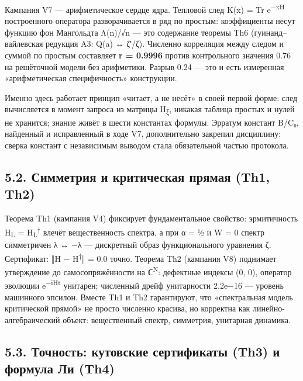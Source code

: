 \documentclass[11pt,a4paper]{article}
\begin{document}
Кампания V7 — арифметическое сердце ядра. Тепловой след K(x) = Tr e\textsuperscript{−xH} построенного оператора разворачивается в ряд по простым: коэффициенты несут функцию фон Мангольдта Λ(n)/√n — это содержание теоремы Th6 (гуинанд–вайлевская редукция A3: Q(a) ↔ ζ′/ζ). Численно корреляция между следом и суммой по простым составляет \textbf{r = 0.9996} против контрольного значения 0.76 на решёточной модели без арифметики. Разрыв 0.24 — это и есть измеренная «арифметическая специфичность» конструкции.

Именно здесь работает принцип «читает, а не несёт» в своей первой форме: след вычисляется в момент запроса из матрицы H\textsubscript{ξ}, никакая таблица простых и нулей не хранится; знание живёт в шести константах формулы. Эрратум констант B/C₀, найденный и исправленный в ходе V7, дополнительно закрепил дисциплину: сверка констант с независимым выводом стала обязательной частью протокола.

\begin{center}\end{center}

\subsection{5.2. Симметрия и критическая прямая (Th1, Th2)}

Теорема Th1 (кампания V4) фиксирует фундаментальное свойство: эрмитичность H\textsubscript{L} = H\textsubscript{L}\textsuperscript{†} влечёт вещественность спектра, а при α = ½ и W = 0 спектр симметричен λ ↔ −λ — дискретный образ функционального уравнения ζ. Сертификат: ‖H − H\textsuperscript{†}‖ = 0.0 точно. Теорема Th2 (кампания V8) поднимает утверждение до самосопряжённости на ℂ\textsuperscript{N}: дефектные индексы (0, 0), оператор эволюции e\textsuperscript{−iHt} унитарен; численный дрейф унитарности 2.2e−16 — уровень машинного эпсилон. Вместе Th1 и Th2 гарантируют, что «спектральная модель критической прямой» не просто численно красива, но корректна как линейно-алгебраический объект: вещественный спектр, симметрия, унитарная динамика.

\subsection{5.3. Точность: кутовские сертификаты (Th3) и формула Ли (Th4)}
\end{document}
